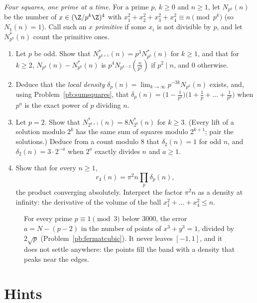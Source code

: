 \begin{exercise}[Journey]\label{pb:densities}
\emph{Four squares, one prime at a time.} For a prime $p$, $k\ge0$ and $n\ge1$, let $N_{p^k}(n)$ be the number of $x\in(\Z/p^k\Z)^4$ with
$x_1^2+x_2^2+x_3^2+x_4^2\equiv n\pmod{p^k}$ (so $N_1(n)=1$). Call such an $x$ \emph{primitive} if some $x_i$ is not divisible by $p$, and let $N^*_{p^k}(n)$ count the
primitive ones.
\begin{enumerate}[label=(\alph*)]
\item Let $p$ be odd. Show that $N^*_{p^{k+1}}(n)=p^3N^*_{p^k}(n)$ for $k\ge1$, and that for $k\ge2$, $N_{p^k}(n)-N^*_{p^k}(n)$ is $p^4N_{p^{k-2}}(\frac n{p^2})$ if
$p^2\mid n$, and $0$ otherwise.
\item Deduce that the \emph{local density} $\delta_p(n)=\lim_{k\to\infty}p^{-3k}N_{p^k}(n)$ exists, and, using Problem~\ref{pb:sumsquares}, that
$\delta_p(n)=\bigl(1-\frac1{p^2}\bigr)\bigl(1+\frac1p+\dots+\frac1{p^a}\bigr)$ when $p^a$ is the exact power of $p$ dividing $n$.
\item Let $p=2$. Show that $N^*_{2^{k+1}}(n)=8N^*_{2^k}(n)$ for $k\ge3$. (Every lift of a solution modulo $2^k$ has the same sum of squares modulo $2^{k+1}$; pair the
solutions.) Deduce from a count modulo $8$ that $\delta_2(n)=1$ for odd $n$, and $\delta_2(n)=3\cdot2^{-a}$ when $2^a$ exactly divides $n$ and $a\ge1$.
\item Show that for every $n\ge1$,
\[
r_4(n)=\pi^2n\prod_p\delta_p(n),
\]
the product converging absolutely. Interpret the factor $\pi^2n$ as a density at infinity: the derivative of the volume of the ball $x_1^2+\dots+x_4^2\le n$.
\end{enumerate}
\end{exercise}

\begin{figure}[ht]
\centering
{}
\caption{For every prime $p\equiv1\pmod3$ below $3000$, the error $a=N-(p-2)$ in the number of points of $x^3+y^3=1$, divided by
$2\sqrt p$ (Problem~\ref{pb:fermatcubic}). It never leaves $[-1,1]$, and it does not settle anywhere: the points fill the band
with a density that peaks near the edges.}
\label{fig:cubic}
\end{figure}

\section{Hints}

